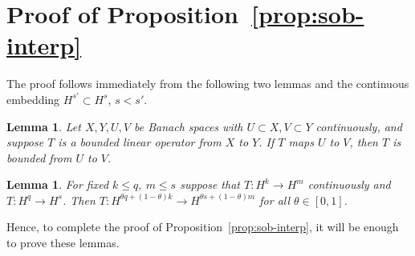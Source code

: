 \documentclass[12pt,reqno]{amsart}
\numberwithin{equation}{section}  %
\numberwithin{figure}{section}
\newtheorem{lemma}[theorem]{Lemma}
\begin{document}
  \section{Proof of Proposition~\ref{prop:sob-interp}}
\label{ssec:pf-sob-interp}
The proof follows immediately from the following two lemmas and the continuous
embedding $H^{s'} \subset H^{s}$, $s < s'$.
%
%
%
%
%                
%
%
%
%
\begin{lemma}
\label{lem:rest-bound}
Let $X, Y, U, V$ be Banach spaces with $U \subset X, V \subset Y$ continuously,
and suppose $T$ is a bounded linear operator from $X$ to $Y$. If $T$ maps $U$
to $V$, then $T$ is bounded from $U$ to $V$.
\end{lemma}
%
%
%
%
%
%
%
%
%
\begin{lemma}
\label{lem:interp-spaces}
For fixed $k \le q, \ m \le s$ suppose that $T: H^{k} \to H^{m}$
continuously and $T: H^{q} \to H^{s}$. Then
$T: H^{\theta q + (1 - \theta)k} \to H^{\theta s +
(1 - \theta) m}$ for all $\theta \in [0,1]$.
%
%
%
\end{lemma}
%
%
%
Hence, to complete the proof of Proposition~\ref{prop:sob-interp},
it will be enough to prove these lemmas.
%
\end{document}
